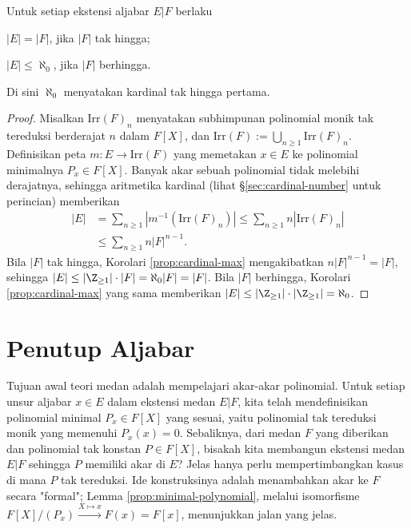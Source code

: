 \begin{proposition}\label{prop:alg-ext-cardinality}
	Untuk setiap ekstensi aljabar $E|F$ berlaku
	\begin{compactitem}
		\item $|E|=|F|$, jika $|F|$ tak hingga;
		\item $|E| \leq \aleph_0$, jika $|F|$ berhingga.
	\end{compactitem}
	Di sini $\aleph_0$ menyatakan kardinal tak hingga pertama.
\end{proposition}
\begin{proof}
	Misalkan $\text{Irr}(F)_n$ menyatakan subhimpunan polinomial monik tak tereduksi berderajat $n$ dalam $F[X]$, dan $\text{Irr}(F) := \displaystyle\bigcup_{n \geq 1} \text{Irr}(F)_n$. Definisikan peta $m: E \to \text{Irr}(F)$ yang memetakan $x \in E$ ke polinomial minimalnya $P_x \in F[X]$. Banyak akar sebuah polinomial tidak melebihi derajatnya, sehingga aritmetika kardinal (lihat \S\ref{sec:cardinal-number} untuk perincian) memberikan
	\begin{align*}
		|E| & = \sum_{n \geq 1} \left| m^{-1}(\text{Irr}(F)_n) \right| \leq \sum_{n \geq 1} n \left| \text{Irr}(F)_n \right| \\
		& \leq \sum_{n \geq 1} n |F|^{n-1}.
	\end{align*}
	Bila $|F|$ tak hingga, Korolari \ref{prop:cardinal-max} mengakibatkan $n|F|^{n-1} = |F|$, sehingga $|E| \leq |\Z_{\geq 1}| \cdot |F| = \aleph_0 |F| = |F|$. Bila $|F|$ berhingga, Korolari \ref{prop:cardinal-max} yang sama memberikan $|E| \leq |\Z_{\geq 1}| \cdot |\Z_{\geq 1}| = \aleph_0$.
\end{proof}

\section{Penutup Aljabar}
Tujuan awal teori medan adalah mempelajari akar-akar polinomial. Untuk setiap unsur aljabar $x \in E$ dalam ekstensi medan $E|F$, kita telah mendefinisikan polinomial minimal $P_x \in F[X]$ yang sesuai, yaitu polinomial tak tereduksi monik yang memenuhi $P_x(x)=0$. Sebaliknya, dari medan $F$ yang diberikan dan polinomial tak konstan $P \in F[X]$, bisakah kita membangun ekstensi medan $E|F$ sehingga $P$ memiliki akar di $E$? Jelas hanya perlu mempertimbangkan kasus di mana $P$ tak tereduksi. Ide konstruksinya adalah menambahkan akar ke $F$ secara "formal"; Lemma \ref{prop:minimal-polynomial}, melalui isomorfisme $F[X]/(P_x) \xrightarrow{X \mapsto x} F(x)=F[x]$, menunjukkan jalan yang jelas.


